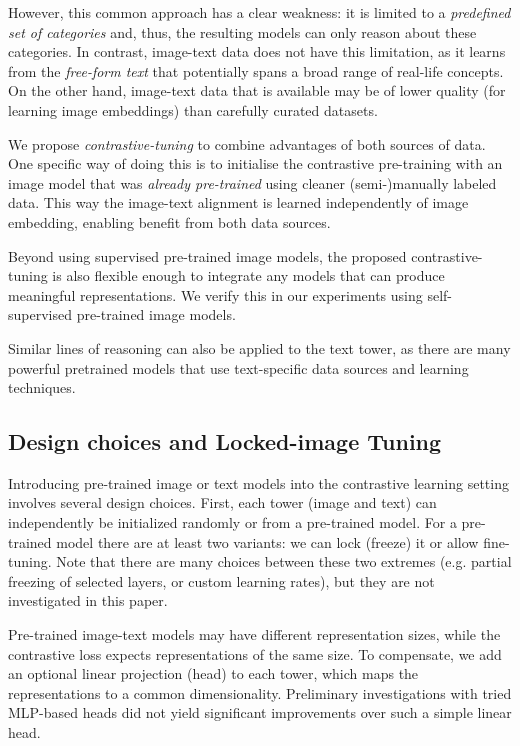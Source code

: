\documentclass[10pt,twocolumn,letterpaper]{article}
\makeatletter
\renewcommand*{\eg}{e.g.\@\xspace}
\makeatother
\begin{document}
However, this common approach has a clear weakness: it is limited to a \textit{predefined set of categories} and, thus, the resulting models can only reason about these categories. In contrast, image-text data does not have this limitation, as it learns from the \textit{free-form text} that potentially spans a broad range of real-life concepts. On the other hand, image-text data that is available may be of lower quality (for learning image embeddings) than carefully curated datasets.

We propose \textit{contrastive-tuning} to combine advantages of both sources of data. One specific way of doing this is to initialise the contrastive pre-training with an image model that was \textit{already pre-trained} using cleaner \mbox{(semi-)}manually labeled data. This way the image-text alignment is learned independently of image embedding, enabling benefit from both data sources. 

Beyond using supervised pre-trained image models, the proposed contrastive-tuning is also flexible enough to integrate any models that can produce meaningful representations. We verify this in our experiments using self-supervised pre-trained image models.

Similar lines of reasoning can also be applied to the text tower, as there are many powerful pretrained models that use text-specific data sources and learning techniques. 


\subsection{Design choices and Locked-image Tuning}
\label{sec:contrastive_design}

Introducing pre-trained image or text models into the contrastive learning setting involves several design choices. First, each tower (image and text) can independently be initialized randomly or from a pre-trained model. For a pre-trained model there are at least two variants: we can lock (freeze) it or allow fine-tuning. Note that there are many choices between these two extremes (\eg partial freezing of selected layers, or custom learning rates), but
they are not investigated in this paper.  

Pre-trained image-text models may have different representation sizes, while the contrastive loss expects representations of the same size. 
To compensate, we add an optional linear projection (head) to each tower, which maps the representations to a common dimensionality. 
Preliminary investigations with tried MLP-based heads did not yield significant improvements over such a simple linear head.
\end{document}
